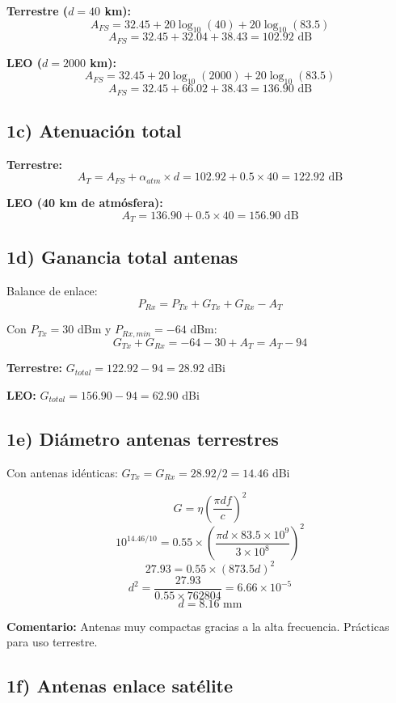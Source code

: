 \documentclass[a4paper,11pt]{article}
\begin{document}
\textbf{Terrestre ($d = 40$ km):}
$$A_{FS} = 32.45 + 20\log_{10}(40) + 20\log_{10}(83.5)$$
$$A_{FS} = 32.45 + 32.04 + 38.43 = 102.92 \text{ dB}$$

\textbf{LEO ($d = 2000$ km):}
$$A_{FS} = 32.45 + 20\log_{10}(2000) + 20\log_{10}(83.5)$$
$$A_{FS} = 32.45 + 66.02 + 38.43 = 136.90 \text{ dB}$$

\subsection*{1c) Atenuación total}

\textbf{Terrestre:}
$$A_T = A_{FS} + \alpha_{atm} \times d = 102.92 + 0.5 \times 40 = 122.92 \text{ dB}$$

\textbf{LEO (40 km de atmósfera):}
$$A_T = 136.90 + 0.5 \times 40 = 156.90 \text{ dB}$$

\subsection*{1d) Ganancia total antenas}

Balance de enlace:
$$P_{Rx} = P_{Tx} + G_{Tx} + G_{Rx} - A_T$$

Con $P_{Tx} = 30$ dBm y $P_{Rx,min} = -64$ dBm:
$$G_{Tx} + G_{Rx} = -64 - 30 + A_T = A_T - 94$$

\textbf{Terrestre:} $G_{total} = 122.92 - 94 = 28.92$ dBi

\textbf{LEO:} $G_{total} = 156.90 - 94 = 62.90$ dBi

\subsection*{1e) Diámetro antenas terrestres}

Con antenas idénticas: $G_{Tx} = G_{Rx} = 28.92/2 = 14.46$ dBi

$$G = \eta \left(\frac{\pi d f}{c}\right)^2$$
$$10^{14.46/10} = 0.55 \times \left(\frac{\pi d \times 83.5 \times 10^9}{3 \times 10^8}\right)^2$$
$$27.93 = 0.55 \times (873.5 d)^2$$
$$d^2 = \frac{27.93}{0.55 \times 762804} = 6.66 \times 10^{-5}$$
$$d = 8.16 \text{ mm}$$

\textbf{Comentario:} Antenas muy compactas gracias a la alta frecuencia. Prácticas para uso terrestre.

\subsection*{1f) Antenas enlace satélite}
\end{document}
